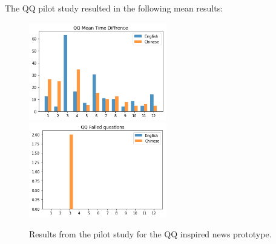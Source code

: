 The QQ pilot study resulted in the following mean results:
\begin{figure}[h]
	\centering
	\includegraphics[width=60mm]{Images/pilot_study_qq_mean_time}
	\includegraphics[width=60mm]{Images/pilot_study_qq_failed}
	\decoRule
	\caption[QQ pilot study results]{Results from the pilot study for the QQ inspired news prototype.}
	\label{fig:pilot_study_qq}
\end{figure}

